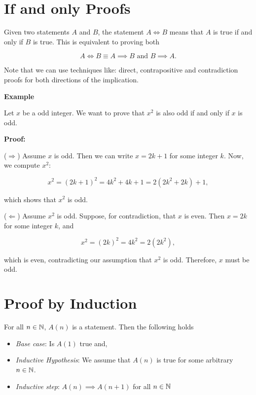 \section{If and only Proofs}

Given two statements \(A\) and \(B\), the statement \(A \iff B\) means that \(A\) is true if and only if \(B\) is true.
This is equivalent to proving both

\[
	A \iff B \equiv A \implies B \text{ and } B \implies A.
\]

Note that we can use techniques like: direct, contrapositive and contradiction proofs for both directions of the implication.

\textbf{Example}

Let \(x\) be a odd integer. We want to prove that \(x^2\) is also odd if and only if \(x\) is odd.

\textbf{Proof:}

(\(\Rightarrow\)) Assume \(x\) is odd. Then we can write \(x = 2k + 1\) for some integer \(k\).
Now, we compute \(x^2\):

\[
	x^2 = (2k + 1)^2 = 4k^2 + 4k + 1 = 2(2k^2 + 2k) + 1,
\]

which shows that \(x^2\) is odd.

(\(\Leftarrow\)) Assume \(x^2\) is odd. Suppose, for contradiction, that \(x\) is even. Then \(x = 2k\) for some integer \(k\), and

\[
	x^2 = (2k)^2 = 4k^2 = 2(2k^2),
\]

which is even, contradicting our assumption that \(x^2\) is odd. Therefore, \(x\) must be odd.

\QED

\section{Proof by Induction}

For all \(n \in \mathbb{N}\), \(A(n)\) is a statement. Then  the following holds

\begin{itemize}

	\item \emph{Base case}: Is \(A(1)\) true and,

	\item \emph{Inductive Hypothesis}: We assume that \(A(n)\) is true for some arbitrary \(n \in \mathbb{N}\).

	\item  \emph{Inductive step}: \(A(n) \implies A(n + 1)\) for all \(n \in \mathbb{N}\)

\end{itemize}


